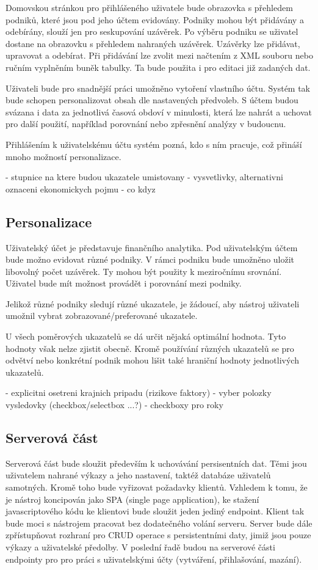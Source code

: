 Domovskou stránkou pro přihlášeného uživatele bude obrazovka s přehledem podniků, které jsou pod jeho účtem evidovány. Podniky mohou být přidávány a odebírány, slouží jen pro seskupování uzávěrek.
Po výběru podniku se uživatel dostane na obrazovku s přehledem nahraných uzávěrek. Uzávěrky lze přidávat, upravovat a odebírat. Při přidávání lze zvolit mezi načtením z XML souboru nebo ručním vyplněním buněk tabulky. Ta bude použita i pro editaci již zadaných dat.  

Uživateli bude pro snadnější práci umožněno vytoření vlastního účtu. Systém tak bude schopen personalizovat obsah dle nastavených předvoleb. S účtem budou svázana i data za jednotlivá časová obdoví v minulosti, která lze nahrát a uchovat pro další použití, například porovnání nebo zpřesnění analýzy v budoucnu.

Přihlášením k uživatelskému účtu systém pozná, kdo s ním pracuje, což přináší mnoho možností personalizace.

- stupnice na ktere budou ukazatele umistovany
- vysvetlivky, alternativni oznaceni ekonomickych pojmu
- co kdyz


\subsection{Personalizace}
Uživatelský účet je představuje finančního analytika. Pod uživatelským účtem bude možno evidovat různé podniky. V rámci podniku bude umožněno uložit libovolný počet uzávěrek. Ty mohou být použity k meziročnímu srovnání.
Uživatel bude mít možnost provádět i porovnání mezi podniky.

Jelikož různé podniky sledují různé ukazatele, je žádoucí, aby nástroj uživateli umožnil vybrat zobrazované/preferované ukazatele. 

U všech poměrových ukazatelů se dá určit nějaká optimální hodnota. Tyto hodnoty však nelze zjistit obecně. Kromě používání různých ukazatelů se pro odvětví nebo konkrétní podnik mohou lišit také hraniční hodnoty jednotlivých ukazatelů.


- explicitni osetreni krajnich pripadu (rizikove faktory)
- vyber polozky vysledovky (checkbox/selectbox ...?)
- checkboxy pro roky


\subsection{Serverová část}
Serverová část bude sloužit především k uchovávání persisentních dat. Těmi jsou uživatelem nahrané výkazy a jeho nastavení, taktéž databáze uživatelů samotných.
Kromě toho bude vyřizovat požadavky klientů. Vzhledem k tomu, že je nástroj koncipován jako SPA (single page application), ke stažení javascriptového kódu ke klientovi bude sloužit jeden jediný endpoint. Klient tak bude moci s nástrojem pracovat bez dodatečného volání serveru. Server bude dále zpřístupňovat rozhraní pro CRUD operace s persistentními daty, jimiž jsou pouze výkazy a uživatelské předolby. V poslední řadě budou na serverové části endpointy pro pro práci s uživatelskými účty (vytváření, přihlašování, mazání).


